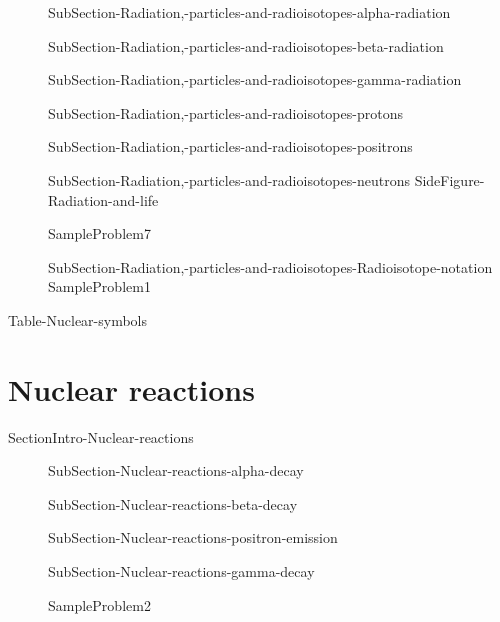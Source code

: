 \documentclass[main.tex]{subfiles}
\begin{document}
\sloppy \begin{description}

\item[] 
{SubSection-Radiation,-particles-and-radioisotopes-alpha-radiation}
\item[] 
  {SubSection-Radiation,-particles-and-radioisotopes-beta-radiation}
\item[] 
{SubSection-Radiation,-particles-and-radioisotopes-gamma-radiation}
\item[] 
{SubSection-Radiation,-particles-and-radioisotopes-protons}
\item[] 
 {SubSection-Radiation,-particles-and-radioisotopes-positrons}
\item[] 
{SubSection-Radiation,-particles-and-radioisotopes-neutrons}
{SideFigure-Radiation-and-life}

  {SampleProblem7}

\item[] 
 {SubSection-Radiation,-particles-and-radioisotopes-Radioisotope-notation}
  {SampleProblem1}


\end{description}


 
 
 
{Table-Nuclear-symbols}

 
 
 
 
 

\section{Nuclear reactions}
{SectionIntro-Nuclear-reactions}



\sloppy \begin{description}

 


 
 
 
 
\item[] 
{SubSection-Nuclear-reactions-alpha-decay}


\item[] 
{SubSection-Nuclear-reactions-beta-decay}


\item[] 
{SubSection-Nuclear-reactions-positron-emission}


\item[] 
{SubSection-Nuclear-reactions-gamma-decay}

 


  {SampleProblem2}


\end{description}
\end{document}
